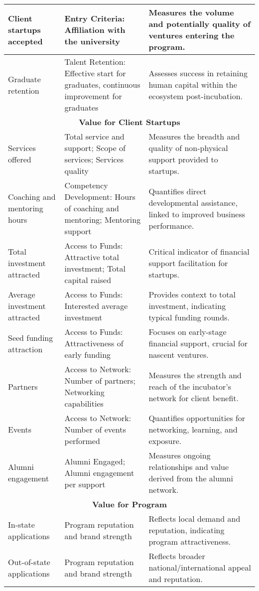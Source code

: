 \documentclass[../Main.tex]{subfiles}
\begin{document}
\begin{longtable}{|p{}|p{}|p{}|}
    \hline
    Client startups accepted & Entry Criteria: Affiliation with the university & Measures the volume and potentially quality of ventures entering the program. \\
    \hline
    Graduate retention & Talent Retention: Effective start for graduates, continuous improvement for graduates & Assesses success in retaining human capital within the ecosystem post-incubation. \\
    \hline
    \multicolumn{3}{|c|}{\textbf{Value for Client Startups}} \\
    \hline
    Services offered & Total service and support; Scope of services; Services quality & Measures the breadth and quality of non-physical support provided to startups. \\
    \hline
    Coaching and mentoring hours & Competency Development: Hours of coaching and mentoring; Mentoring support & Quantifies direct developmental assistance, linked to improved business performance. \\
    \hline
    Total investment attracted & Access to Funds: Attractive total investment; Total capital raised & Critical indicator of financial support facilitation for startups. \\
    \hline
    Average investment attracted & Access to Funds: Interested average investment & Provides context to total investment, indicating typical funding rounds. \\
    \hline
    Seed funding attraction & Access to Funds: Attractiveness of early funding & Focuses on early-stage financial support, crucial for nascent ventures. \\
    \hline
    Partners & Access to Network: Number of partners; Networking capabilities & Measures the strength and reach of the incubator's network for client benefit. \\
    \hline
    Events & Access to Network: Number of events performed & Quantifies opportunities for networking, learning, and exposure. \\
    \hline
    Alumni engagement & Alumni Engaged; Alumni engagement per support & Measures ongoing relationships and value derived from the alumni network. \\
    \hline
    \multicolumn{3}{|c|}{\textbf{Value for Program}} \\
    \hline
    In-state applications & Program reputation and brand strength & Reflects local demand and reputation, indicating program attractiveness. \\
    \hline
    Out-of-state applications & Program reputation and brand strength & Reflects broader national/international appeal and reputation. \\

\end{longtable}
\end{document}
